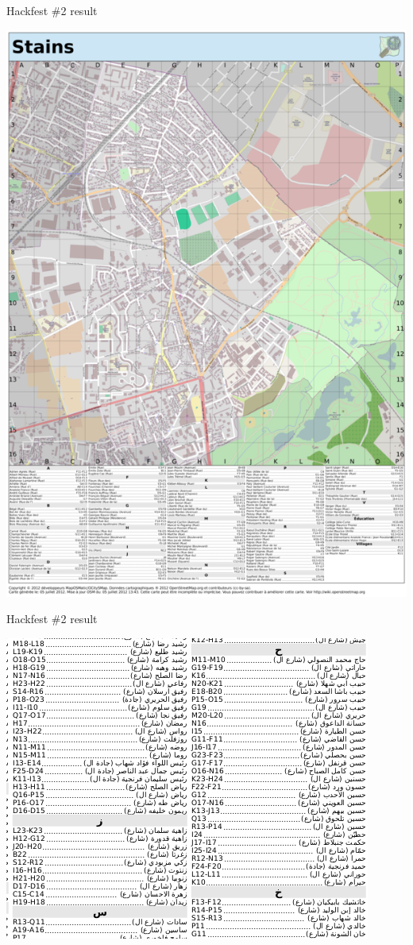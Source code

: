 \documentclass{beamer}
\begin{document}
\begin{frame}{Hackfest \#2 result}
  \begin{center}
    \includegraphics[height=0.8\textheight]{stains.png}
  \end{center}
\end{frame}

\begin{frame}{Hackfest \#2 result}
  \begin{center}
    \includegraphics[height=0.8\textheight]{arabic-index.png}
  \end{center}
\end{frame}
\end{document}
